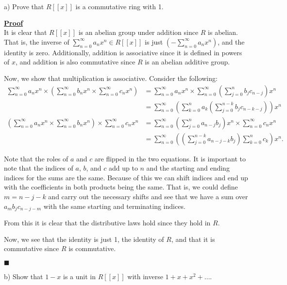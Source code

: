 \documentclass[12pt,a4paper]{article}
\newenvironment{proof}
{
\textbf{\underline{Proof}} \\
}
{
\begin{flushright}
$\blacksquare$
\end{flushright}}
\begin{document}
a) Prove that $R[[x]]$ is a commutative ring with 1.

\begin{proof}
    It is clear that $R[[x]]$ is an abelian group under addition since $R$ is abelian.
    That is, the inverse of $\sum_{n=0}^{\infty} a_n x^n \in R[[x]]$ is just $(-\sum_{n=0}^{\infty} a_n x^n)$, and the identity is zero. 
    Additionally, addition is associative since it is defined in powers of $x$, and addition is also commutative since $R$ is an abelian additive group.

    Now, we show that multiplication is associative.
    Consider the following:
    \begin{align*}
        \sum_{n=0}^{\infty} a_n x^n \times \left( \sum_{n=0}^{\infty} b_{n}x^{n} \times \sum_{n=0}^{\infty} c_{n}x^{n} \right) &= \sum_{n=0}^{\infty} a_n x^n \times \sum_{n=0}^{\infty} \left( \sum_{j=0}^{n} b_{j}c_{n-j} \right) x^{n} \\
        &= \sum_{n=0}^{\infty} \left( \sum_{k=0}^{n} a_k \left( \sum_{j=0}^{n-k} b_{j}c_{n-k-j} \right) \right) x^{n} \\
        \left( \sum_{n=0}^{\infty} a_n x^n \times \sum_{n=0}^{\infty} b_n x^n \right) \times \sum_{n=0}^{\infty} c_n x^n &= \sum_{n=0}^{\infty} \left( \sum_{j=0}^{n} a_{n-j} b_{j} \right) x^n \times \sum_{n=0}^{\infty} c_n x^n \\ 
        &= \sum_{n=0}^{\infty} \left( \left(\sum_{j=0}^{n-k} a_{n-j-k} b_{j} \right) \sum_{k=0}^{n} c_{k} \right) x^n
    .\end{align*}
    
    Note that the roles of $a$ and $c$ are flipped in the two equations.
    It is important to note that the indices of $a$, $b$, and $c$ add up to $n$ and the starting and ending indices for the sums are the same.
    Because of this we can shift indices and end up with the coefficients in both products being the same.
    That is, we could define $m = n - j -k$ and carry out the necessary shifts and see that we have a sum over $a_mb_jc_{n-j-m}$ with the same starting and terminating indices.

    From this it is clear that the distributive laws hold since they hold in $R$.

    Now, we see that the identity is just 1, the identity of $R$, and that it is commutative since $R$ is commutative.
\end{proof}

b) Show that $1-x$ is a unit in $R[[x]]$ with inverse $1 + x + x^2 + \ldots$.
\end{document}
